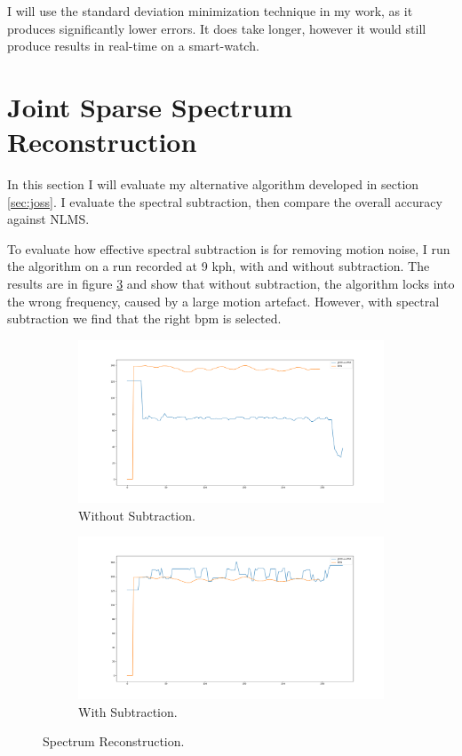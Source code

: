 \documentclass[12pt,a4paper,twoside,openright]{report}
\begin{document}
I will use the standard deviation minimization technique in my work, as it
produces significantly lower errors. It does take longer, however it would
still produce results in real-time on a smart-watch.

\section{Joint Sparse Spectrum Reconstruction}

In this section I will evaluate my alternative algorithm developed in section
\ref{sec:joss}. I evaluate the spectral subtraction, then compare the
overall accuracy against NLMS.

To evaluate how effective spectral subtraction is for removing motion noise, I
run the algorithm on a run recorded at 9 kph, with and without subtraction.
The results are in figure \ref{fig:joss_eg} and show that without subtraction,
the algorithm locks into the wrong frequency, caused by a large motion
artefact. However, with spectral subtraction we find that the right bpm is
selected.

\begin{figure}[H]
\begin{subfigure}{.5\textwidth}
  \centering
  \includegraphics[width=\linewidth]{figs/joss_nosub.png}
  \caption{Without Subtraction.}
  \label{fig:joss_nosub}
\end{subfigure}%
\begin{subfigure}{.5\textwidth}
  \centering
  \includegraphics[width=\linewidth]{figs/joss_sub.png}
  \caption{With Subtraction.}
  \label{fig:joss_sub}
\end{subfigure}
\caption{Spectrum Reconstruction.}
\label{fig:joss_eg}
\end{figure}
\end{document}
